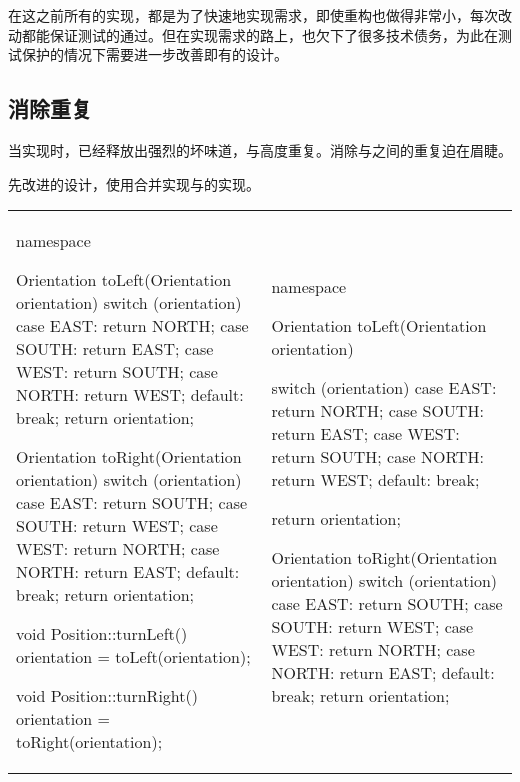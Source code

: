 \begin{content}
     在这之前所有的实现，都是为了快速地实现需求，即使重构也做得非常小，每次改动都能保证测试的通过。但在实现需求的路上，也欠下了很多技术债务，为此在测试保护的情况下需要进一步改善即有的设计。

\subsection{消除重复}

当实现时，已经释放出强烈的坏味道，与高度重复。消除与之间的重复迫在眉睫。

先改进的设计，使用合并实现与的实现。

\begin{tabular}{@{}p{}%
                 | p{}@{}}
\begin{c++}[caption={src/robot-cleaner/Position.cpp}]
namespace
{
    Orientation toLeft(Orientation orientation)
    {
        switch (orientation)
        {
        case EAST:  return NORTH;
        case SOUTH: return EAST;
        case WEST:  return SOUTH;
        case NORTH: return WEST;
        default: break;
        }   
        return orientation;
    }

    Orientation toRight(Orientation orientation)
    {
        switch (orientation)
        {
        case EAST:  return SOUTH;
        case SOUTH: return WEST;
        case WEST:  return NORTH;
        case NORTH: return EAST;
        default: break;
        }
        return orientation;
    }
}

void Position::turnLeft()
{
    orientation = toLeft(orientation);
}

void Position::turnRight()
{
    orientation = toRight(orientation);
}    
\end{c++}
&
\begin{c++}[caption={src/robot-cleaner/Position.cpp}]
namespace
{
    Orientation toLeft(Orientation orientation)
    {
        switch (orientation)
        {
        case EAST:  return NORTH;
        case SOUTH: return EAST;
        case WEST:  return SOUTH;
        case NORTH: return WEST;
        default: break;
        }
        
        return orientation;
    }

    Orientation toRight(Orientation orientation)
    {
        switch (orientation)
        {
        case EAST:  return SOUTH;
        case SOUTH: return WEST;
        case WEST:  return NORTH;
        case NORTH: return EAST;
        default: break;
        }
        return orientation;
    }
    
}
\end{c++}
\end{tabular}
\end{content}
